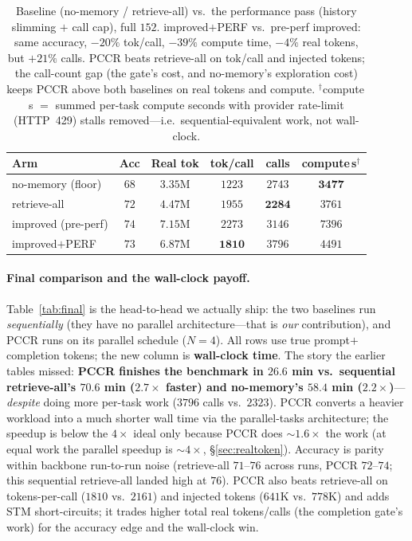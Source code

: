 \documentclass[10pt,twocolumn]{article}
\begin{document}
\begin{table}[t]
\centering\small
\setlength{\tabcolsep}{4pt}
\begin{tabular}{@{}lccccc@{}}
\toprule
Arm & Acc & Real tok & tok/call & calls & compute\,s$^{\dagger}$ \\
\midrule
no-memory (floor)   & $68$ & $\mathbf{3.35}$M & $1223$ & $2743$ & $\mathbf{3477}$ \\
retrieve-all        & $72$ & $4.47$M & $1955$ & $\mathbf{2284}$ & $3761$ \\
improved (pre-perf) & $74$ & $7.15$M & $2273$ & $3146$ & $7396$ \\
improved$+$PERF     & $73$ & $6.87$M & $\mathbf{1810}$ & $3796$ & $4491$ \\
\bottomrule
\end{tabular}
\caption{Baseline (no-memory / retrieve-all) vs.\ the performance pass (history slimming $+$ call
cap), full $152$. improved$+$PERF vs.\ pre-perf improved: same accuracy, $-20\%$ tok/call, $-39\%$
compute time, $-4\%$ real tokens, but $+21\%$ calls. PCCR beats retrieve-all on tok/call and injected
tokens; the call-count gap (the gate's cost, and no-memory's exploration cost) keeps PCCR above both
baselines on real tokens and compute. $^{\dagger}$compute\,s $=$ summed per-task compute seconds with
provider rate-limit (HTTP~429) stalls removed---i.e.\ sequential-equivalent work, not wall-clock.}
\label{tab:perf}
\end{table}

\paragraph{Final comparison and the wall-clock payoff.} Table~\ref{tab:final} is the head-to-head we
actually ship: the two baselines run \emph{sequentially} (they have no parallel architecture---that
is \emph{our} contribution), and PCCR runs on its parallel schedule ($N{=}4$). All rows use true
prompt$+$completion tokens; the new column is \textbf{wall-clock time}. The story the earlier tables
missed: \textbf{PCCR finishes the benchmark in $26.6$ min vs.\ sequential retrieve-all's $70.6$ min
($2.7\times$ faster) and no-memory's $58.4$ min ($2.2\times$)}---\emph{despite} doing more per-task
work ($3796$ calls vs.\ $2323$). PCCR converts a heavier workload into a much shorter wall time via
the parallel-tasks architecture; the speedup is below the $4\times$ ideal only because PCCR does
${\sim}1.6\times$ the work (at equal work the parallel speedup is ${\sim}4\times$, \S\ref{sec:realtoken}).
Accuracy is parity within backbone run-to-run noise (retrieve-all $71$--$76$ across runs, PCCR
$72$--$74$; this sequential retrieve-all landed high at $76$). PCCR also beats retrieve-all on
tokens-per-call ($1810$ vs.\ $2161$) and injected tokens ($641$K vs.\ $778$K) and adds STM
short-circuits; it trades higher total real tokens/calls (the completion gate's work) for the
accuracy edge and the wall-clock win.
\end{document}
